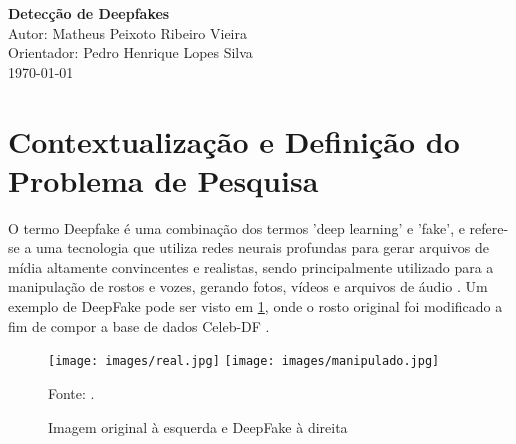 \documentclass[12pt,a4paper, brazil]{article}
\begin{document}
\begin{center}
{\textbf {\huge Detecção de Deepfakes}}\\[5mm]
{\large Autor: Matheus Peixoto Ribeiro Vieira} \\[2mm]
{\large Orientador: Pedro Henrique Lopes Silva} \\[5mm]
\today\\[5mm] %
\end{center}



\section{Contextualização e Definição do Problema de Pesquisa}
    \par O termo Deepfake é uma combinação dos termos 'deep learning' e 'fake', e refere-se a uma tecnologia que utiliza redes neurais profundas para gerar arquivos de mídia altamente convincentes e realistas, sendo principalmente utilizado para a manipulação de rostos e vozes, gerando fotos, vídeos e arquivos de áudio \cite{Mirsky_2021}. Um exemplo de DeepFake pode ser visto em \ref{fig:original_deepfake}, onde o rosto original foi modificado a fim de compor a base de dados Celeb-DF \cite{li2020celebdflargescalechallengingdataset}.
    
    \begin{figure}[htbp]
        \centering
        \caption{Imagem original à esquerda e DeepFake à direita}
        \label{fig:original_deepfake}
        \texttt{[image: images/real.jpg]}
        \hspace{0.05\textwidth} 
        \texttt{[image: images/manipulado.jpg]}

        \small{Fonte: \cite{li2020celebdflargescalechallengingdataset}.}
    \end{figure}
\end{document}
